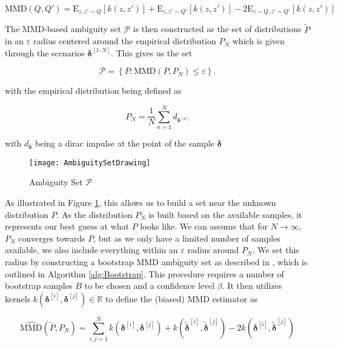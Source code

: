 \begin{equation} \label{MMD Kernel}
\text{MMD}(Q, Q') = \text{E}_{z,z' \sim Q}[k(z,z')] + \text{E}_{z,z' \sim Q'}[k(z,z')] - 2\text{E}_{z\sim Q, z' \sim Q'}[k(z,z')]
\end{equation}

The MMD-based ambiguity set $\mathcal{P}$ is then constructed as the set of distributions $\tilde{P}$ in an $\varepsilon$ radius centered around the empirical distribution $P_N$ which is given through the scenarios $\boldsymbol{\delta}^{[1:N]}$. This gives us the set

\begin{equation} \label{ambiguity set}
\mathcal{P} =  \left\{ P : \text{MMD} (P, P_N) \leq \varepsilon \right\}.
\end{equation}

with the empirical distribution being defined as

\begin{equation} \label{empirical distribution}
P_N = \frac{1}{N}\sum_{n = 1}^N d_{\boldsymbol{\delta}^{[n]}}
\end{equation}

with $d_{\boldsymbol{\delta}}$ being a dirac impulse at the point of the sample $\boldsymbol{\delta}$



\begin{figure}[t]
\centering
\texttt{[image: AmbiguitySetDrawing]}
\caption{Ambiguity Set $\mathcal{P}$}
\label{AmbiguityPic}
\end{figure}

As illustrated in Figure \ref{AmbiguityPic}, this allows us to build a set near the unknown distribution $P$. As the distribution $P_N$ is built based on the available samples, it represents our best guess at what $P$ looks like. We can assume that for $N \to \infty$, $P_N$ converges towards $P$, but as we only have a limited number of samples available, we also include everything within an $\varepsilon$ radius around $P_N$. We set this radius by constructing a bootstrap MMD ambiguity set as described in \cite{Yassine_22}, which is outlined in Algorithm \ref{alg:Bootstrap}. This procedure requires a number of bootstrap samples $B$ to be chosen and a confidence level $\beta$. It then utilizes kernels $k(\boldsymbol{\delta}^{[i]}, \boldsymbol{\delta}^{[j]}) \in \mathbb{R}$ to define the (biased) MMD estimator as 

\begin{equation} \label{ambiguity set approx}
\widehat{\text{MMD}} (\tilde{P}, P_N) = \sum_{i,j = 1}^N k(\boldsymbol{\delta}^{[i]}, \boldsymbol{\delta}^{[j]}) + k(\tilde{\boldsymbol{\delta}}^{[i]}, \tilde{\boldsymbol{\delta}}^{[j]}) - 2 k(\boldsymbol{\delta}^{[i]}, \tilde{\boldsymbol{\delta}}^{[j]})
\end{equation}

